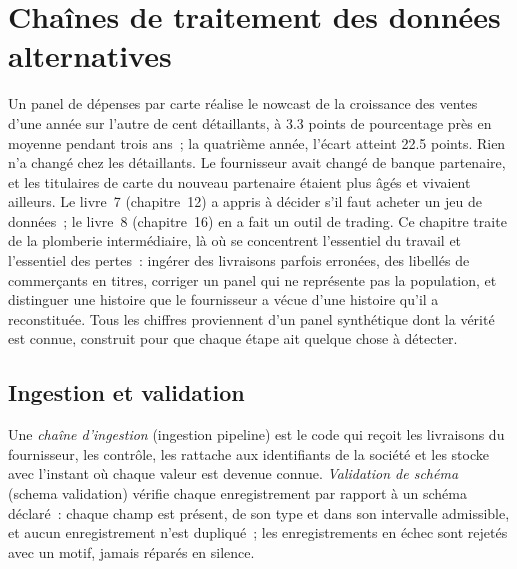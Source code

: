 \chapter{Chaînes de traitement des données alternatives}\label{ch:ml:alternative-data-pipelines}

Un panel de dépenses par carte réalise le nowcast de la croissance des ventes d'une année sur l'autre de cent détaillants, à 3.3 points de pourcentage près en moyenne
pendant trois ans~; la quatrième année, l'écart atteint 22.5 points. Rien n'a changé chez les détaillants. Le fournisseur avait changé de banque partenaire,
et les titulaires de carte du nouveau partenaire étaient plus âgés et vivaient ailleurs. Le livre~7 (chapitre~12) a appris à décider s'il faut acheter
un jeu de données~; le livre~8 (chapitre~16) en a fait un outil de trading. Ce chapitre traite de la plomberie intermédiaire, là où se concentrent l'essentiel du travail et l'essentiel
des pertes~: ingérer des livraisons parfois erronées,  des libellés de commerçants en titres, corriger un panel
qui ne représente pas la population, et distinguer une histoire que le fournisseur a vécue d'une histoire qu'il a reconstituée. Tous les chiffres
proviennent d'un panel synthétique dont la vérité est connue, construit pour que chaque étape ait quelque chose à détecter.

\section{Ingestion et validation}

\begin{definition}\label{def:ml:alternative-data-pipelines:ingest}
Une \emph{chaîne d'ingestion} (ingestion pipeline) est le code qui reçoit les livraisons du fournisseur, les contrôle, les rattache
aux identifiants de la société et les stocke avec l'instant où chaque valeur est devenue connue. \emph{Validation de
schéma} (schema validation) vérifie chaque enregistrement par rapport à un schéma déclaré~: chaque champ est présent, de son type et dans
son intervalle admissible, et aucun enregistrement n'est dupliqué~; les enregistrements en échec sont rejetés avec un motif, jamais réparés en silence.
\end{definition}

